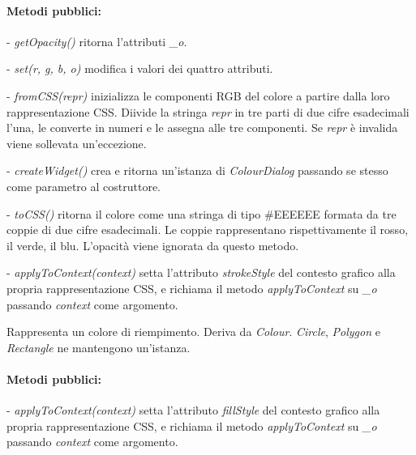 \paragraph{Metodi pubblici:}
\begin{elencopuntato}[\subsubsecindent]
\item[-] \textit{getOpacity()} ritorna l'attributi \textit{{\_}o}.
\item[-] \textit{set(r, g, b, o)} modifica i valori dei quattro attributi.
\item[-] \textit{fromCSS(repr)} inizializza le componenti RGB del colore a partire dalla loro rappresentazione CSS. Diivide la stringa \textit{repr} in tre parti di due cifre esadecimali l'una, le converte in numeri e le assegna alle tre componenti. Se \textit{repr} \`e invalida viene sollevata un'eccezione.
\item[-] \textit{createWidget()} crea e ritorna un'istanza di \textit{ColourDialog} passando se stesso come parametro al costruttore.
\item[-] \textit{toCSS()} ritorna il colore come una stringa di tipo {\#}EEEEEE formata da tre coppie di due cifre esadecimali. Le coppie rappresentano rispettivamente il rosso, il verde, il blu. L'opacit\`a viene ignorata da questo metodo.
\item[-] \textit{applyToContext(context)} setta l'attributo \textit{strokeStyle} del contesto grafico alla propria rappresentazione CSS, e richiama il metodo \textit{applyToContext} su \textit{{\_}o} passando \textit{context} come argomento.
\end{elencopuntato}

Rappresenta un colore di riempimento.
Deriva da \textit{Colour}.
\textit{Circle}, \textit{Polygon} e \textit{Rectangle} ne mantengono un'istanza.
\paragraph{Metodi pubblici:}
\begin{elencopuntato}[\subsubsecindent]
\item[-] \textit{applyToContext(context)} setta l'attributo \textit{fillStyle} del contesto grafico alla propria rappresentazione CSS, e richiama il metodo \textit{applyToContext} su \textit{{\_}o} passando \textit{context} come argomento.
\end{elencopuntato}

